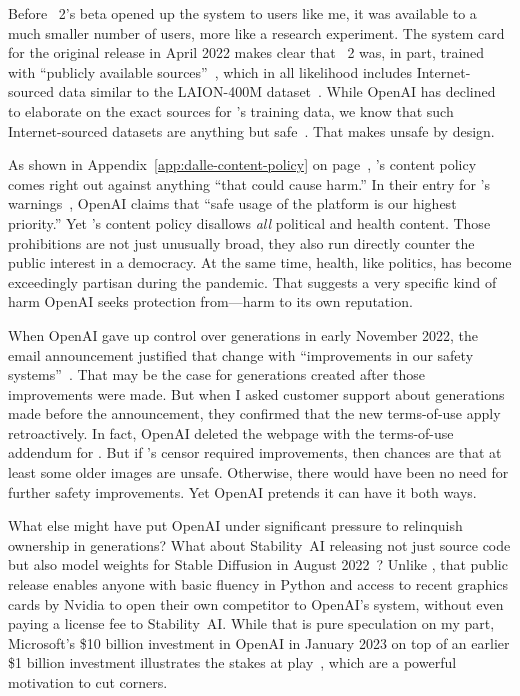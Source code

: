 Before \DALLE~2's beta opened up the system to users like me, it was available
to a much smaller number of users, more like a research experiment. The system
card~\cite{GreenProcopeea2022,ProcopeCheemaea2022} for the original release in
April 2022 makes clear that \DALLE~2 was, in part, trained with ``publicly
available sources''~\cite{MishkinAhmad2022}, which in all likelihood includes
Internet-sourced data similar to the LAION-400M
dataset~\cite{SchuhmannVencuea2021}. While OpenAI has declined to elaborate on
the exact sources for \DALLE's training data, we know that such Internet-sourced
datasets are anything but safe~\cite{BirhanePrabhuea2021}. That makes \DALLE{}
unsafe by design.

As shown in Appendix~\ref{app:dalle-content-policy} on
page~\pageref{app:dalle-content-policy}, \DALLE's content policy comes right out
against anything ``that could cause harm.'' In their  entry for \DALLE's
warnings~\cite{Natalie2022}, OpenAI claims that ``safe usage of the platform is
our highest priority.'' Yet \DALLE's content policy disallows \emph{all}
political and health content. Those prohibitions are not just unusually broad,
they also run directly counter the public interest in a democracy. At the same
time, health, like politics, has become exceedingly partisan during the
pandemic. That suggests a very specific kind of harm OpenAI seeks protection
from---harm to its own reputation.

When OpenAI gave up control over generations in early November 2022, the email
announcement justified that change with ``improvements in our safety
systems''~\cite{OpenAI2022g}. That may be the case for generations created after
those improvements were made. But when I asked customer support about
generations made before the announcement, they confirmed that the new
terms-of-use apply retroactively. In fact, OpenAI deleted the webpage with the
terms-of-use addendum for \DALLE. But if \DALLE's censor required improvements,
then chances are that at least some older images are unsafe. Otherwise, there
would have been no need for further safety improvements. Yet OpenAI pretends it
can have it both ways.

What else might have put OpenAI under significant pressure to relinquish
ownership in generations? What about Stability~AI releasing not just source code
but also model weights for Stable Diffusion in August
2022~\cite{StabilityAI2022}? Unlike \DALLE, that public release enables anyone
with basic fluency in Python and access to recent graphics cards by Nvidia to
open their own competitor to OpenAI's system, without even paying a license fee
to Stability~AI. While that is pure speculation on my part, Microsoft's \$10
billion investment in OpenAI in January 2023 on top of an earlier \$1 billion
investment illustrates the stakes at play~\cite{Bass2023}, which are a powerful
motivation to cut corners.

